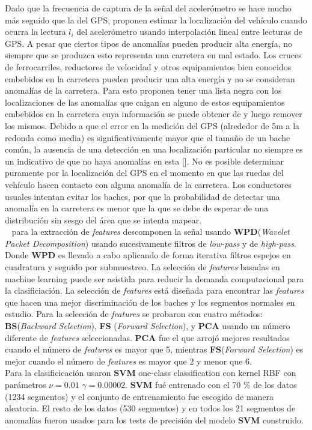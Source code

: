 Dado que la frecuencia de captura de la señal del acelerómetro se hace mucho más seguido que la del GPS, proponen estimar la localización del vehículo
cuando ocurra la lectura $l_i$ del acelerómetro usando interpolación lineal entre lecturas de GPS. A pesar que ciertos tipos de anomalías pueden producir
alta energía, no siempre que se produzca esto representa una carretera en mal estado. Los cruces de ferrocarriles, reductores de velocidad y otros
equipamientos bien conocidos embebidos en la carretera pueden producir una alta energía y no se consideran anomalías de la carretera. Para esto proponen
tener una lista negra con los localizaciones de las anomalías que caigan en alguno de estos equipamientos embebidos en la carretera cuya información se
puede obtener de y luego remover los mismos. Debido a que el error en la medición del GPS (alrededor de 5m a la redonda como media) es significativamente
mayor que el tamaño de un bache común, la ausencia de una detección en una localización particular no siempre es un indicativo de que no haya anomalías en
esta []. No es posible determinar puramente por la localización del GPS en el momento en que las ruedas del vehículo hacen contacto con alguna anomalía de
la carretera. Los conductores usuales intentan evitar los baches, por que la probabilidad de detectar una anomalía en la carretera es menor que la que se
debe de esperar de una distribución sin sesgo del área que se intenta mapear.\\

~\cite{cong2013applying} para la extracción de \emph{features} descomponen la señal usando \textbf{WPD}(\emph{Wavelet Packet Decomposition}) usando
sucesivamente filtros de \emph{low-pass} y de \emph{high-pass}. Donde \textbf{WPD} es llevado a cabo aplicando de forma iterativa filtros espejos en
cuadratura y seguido por submuestreo. La selección de \emph{features} basadas en machine learning puede ser asistida para reducir la demanda computacional
para la clasificiación. La selección de \emph{features} está diseñada para encontrar las \emph{features} que hacen una mejor discriminación de los baches
y los segmentos normales en estudio. Para la selección de \emph{features} se probaron con cuatro métodos: \textbf{BS}(\emph{Backward Selection}), \textbf{FS}
(\emph{Forward Selection}),  y \textbf{PCA} usando un número diferente de \emph{features} seleccionadas. \textbf{PCA} fue el que
arrojó mejores resultados cuando el número de \emph{features} es mayor que 5, mientras \textbf{FS}(\emph{Forward Selection}) es mejor cuando el número de
\emph{features} es mayor que 2 y menor que 6.\\
Para la clasificicación usaron \textbf{SVM} one-class classification con kernel RBF con parámetros  $\nu = 0.01$  $\gamma = 0.00002$. \textbf{SVM} fué
entrenado con el 70 \%  de los datos (1234 segmentos) y el conjunto de entrenamiento fue escogido de manera aleatoria. El resto de los datos  (530 segmentos)
y en todos los 21 segmentos de anomalías fueron usados para los tests de precisión del modelo \textbf{SVM} construido. 

